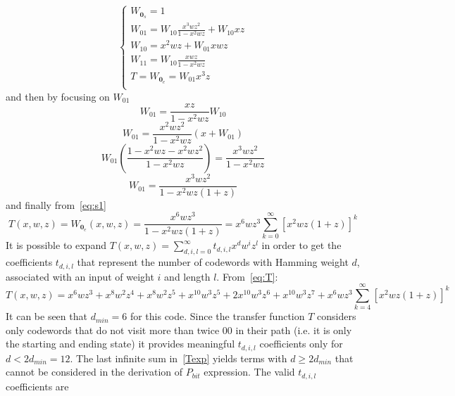 \documentclass[10pt]{article}
\begin{document}
\begin{equation}
\begin{cases}
	W_{\mathbf{0}_s} = 1 \\ %
	W_{01} = W_{10}\frac{x^3wz^2}{1-x^2wz} + W_{10}xz \\
	W_{10} = x^2wz + W_{01}xwz \\
	W_{11} = W_{10}\frac{xwz}{1-x^2wz} \\
	T = W_{\mathbf{0}_e} = W_{01}x^3z\\
\end{cases}
\end{equation}
and then by focusing on $W_{01}$
\begin{equation*}
	W_{01} =  \frac{xz}{1-x^2wz}W_{10}
\end{equation*}
\begin{equation*}
	W_{01}  =  \frac{x^2wz^2}{1-x^2wz}(x + W_{01})
\end{equation*}
\begin{equation*}
	W_{01}\left(\frac{1 - x^2wz - x^2wz^2}{1-x^2wz} \right) = \frac{x^3wz^2}{1-x^2wz}
\end{equation*}
\begin{equation*}
	W_{01} = \frac{x^3wz^2}{1-x^2wz(1+z)}
\end{equation*}
and finally from~\eqref{eq:s1}
\begin{equation}\label{eq:T}
	T(x, w, z) = W_{\mathbf{0}_e}(x, w, z) = \frac{x^6wz^3}{1-x^2wz(1+z)} = x^6wz^3\sum_{k=0}^{\infty} [x^2wz(1+z)]^k
\end{equation}
It is possible to expand $T(x,w,z) = \sum_{d, i, l = 0}^{\infty} t_{d, i, l}x^dw^iz^l$ in order to get the coefficients $t_{d,i,l}$ that represent the number of codewords with Hamming weight $d$, associated with an input of weight $i$ and length $l$. From~\eqref{eq:T}:
\begin{equation}\label{Texp}
	T(x, w, z) = x^6wz^3 + x^8w^2z^4 + x^8w^2z^5 + x^{10}w^3z^5 + 2x^{10}w^3z^6 + x^{10}w^3z^7 + x^6wz^3\sum_{k=4}^{\infty}[x^2wz(1+z)]^k
\end{equation}
It can be seen that $d_{min}=6$ for this code. Since the transfer function $T$ considers only codewords that do not visit more than twice $00$ in their path (i.e. it is only the starting and ending state) it provides meaningful $t_{d, i, l}$ coefficients only for $d < 2d_{min} = 12$. The last infinite sum in~\eqref{Texp} yields terms with $d \ge 2d_{min}$ that cannot be considered in the derivation of $P_{bit}$ expression. The valid $t_{d, i, l}$ coefficients are
\end{document}
